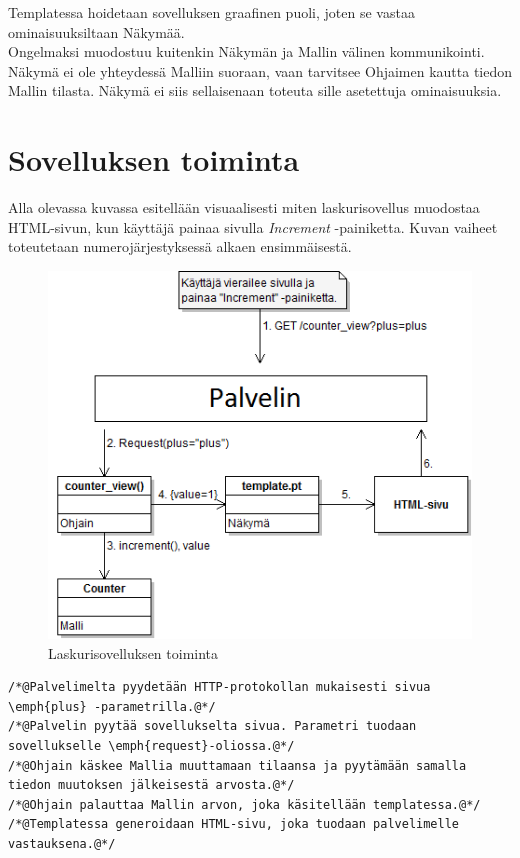 \documentclass[utf8]{gradu3}
\begin{document}
Templatessa hoidetaan sovelluksen graafinen puoli, joten se vastaa ominaisuuksiltaan Näkymää. \\ Ongelmaksi muodostuu kuitenkin Näkymän ja Mallin välinen kommunikointi. Näkymä ei ole yhteydessä Malliin suoraan, vaan tarvitsee Ohjaimen kautta tiedon Mallin tilasta.  Näkymä ei siis sellaisenaan toteuta sille asetettuja ominaisuuksia. \\

\section{Sovelluksen toiminta}
Alla olevassa kuvassa esitellään visuaalisesti miten laskurisovellus muodostaa HTML-sivun, kun käyttäjä painaa sivulla \emph{Increment} -painiketta. Kuvan
vaiheet toteutetaan numerojärjestyksessä alkaen ensimmäisestä.
\begin{figure}[h]
\centering
\includegraphics[scale=0.87]{laskurisovellus.png}
\caption{Laskurisovelluksen toiminta}
\end{figure}

\begin{lstlisting}
/*@Palvelimelta pyydetään HTTP-protokollan mukaisesti sivua \emph{plus} -parametrilla.@*/
/*@Palvelin pyytää sovellukselta sivua. Parametri tuodaan sovellukselle \emph{request}-oliossa.@*/
/*@Ohjain käskee Mallia muuttamaan tilaansa ja pyytämään samalla tiedon muutoksen jälkeisestä arvosta.@*/
/*@Ohjain palauttaa Mallin arvon, joka käsitellään templatessa.@*/
/*@Templatessa generoidaan HTML-sivu, joka tuodaan palvelimelle vastauksena.@*/
\end{lstlisting}
\end{document}

